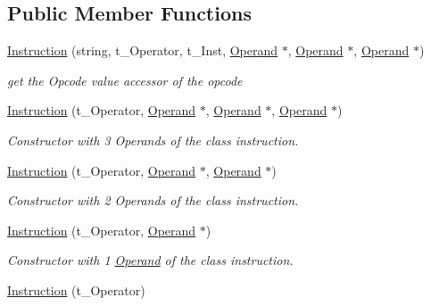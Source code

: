 \subsection*{Public Member Functions}
\begin{DoxyCompactItemize}
\item 
\hyperlink{class_instruction_a055c483afc0512b68f6211fdbb6774ba}{Instruction} (string, t\+\_\+\+Operator, t\+\_\+\+Inst, \hyperlink{class_operand}{Operand} $\ast$, \hyperlink{class_operand}{Operand} $\ast$, \hyperlink{class_operand}{Operand} $\ast$)
\begin{DoxyCompactList}\small\item\em get the Opcode value accessor of the opcode \end{DoxyCompactList}\item 
\hypertarget{class_instruction_a2f1ed1606d4090b8a4c255e3af9e34c8}{}\hyperlink{class_instruction_a2f1ed1606d4090b8a4c255e3af9e34c8}{Instruction} (t\+\_\+\+Operator, \hyperlink{class_operand}{Operand} $\ast$, \hyperlink{class_operand}{Operand} $\ast$, \hyperlink{class_operand}{Operand} $\ast$)\label{class_instruction_a2f1ed1606d4090b8a4c255e3af9e34c8}

\begin{DoxyCompactList}\small\item\em Constructor with 3 Operands of the class instruction. \end{DoxyCompactList}\item 
\hypertarget{class_instruction_a0b1ed4432c9c5823ee9e522c7d11bb5f}{}\hyperlink{class_instruction_a0b1ed4432c9c5823ee9e522c7d11bb5f}{Instruction} (t\+\_\+\+Operator, \hyperlink{class_operand}{Operand} $\ast$, \hyperlink{class_operand}{Operand} $\ast$)\label{class_instruction_a0b1ed4432c9c5823ee9e522c7d11bb5f}

\begin{DoxyCompactList}\small\item\em Constructor with 2 Operands of the class instruction. \end{DoxyCompactList}\item 
\hypertarget{class_instruction_a6ae2a4dd83500f9d538a653823161b1c}{}\hyperlink{class_instruction_a6ae2a4dd83500f9d538a653823161b1c}{Instruction} (t\+\_\+\+Operator, \hyperlink{class_operand}{Operand} $\ast$)\label{class_instruction_a6ae2a4dd83500f9d538a653823161b1c}

\begin{DoxyCompactList}\small\item\em Constructor with 1 \hyperlink{class_operand}{Operand} of the class instruction. \end{DoxyCompactList}\item 
\hypertarget{class_instruction_ab2d989cc18e9bf0eeee194a7614514fa}{}\hyperlink{class_instruction_ab2d989cc18e9bf0eeee194a7614514fa}{Instruction} (t\+\_\+\+Operator)\label{class_instruction_ab2d989cc18e9bf0eeee194a7614514fa}


\end{DoxyCompactItemize}
